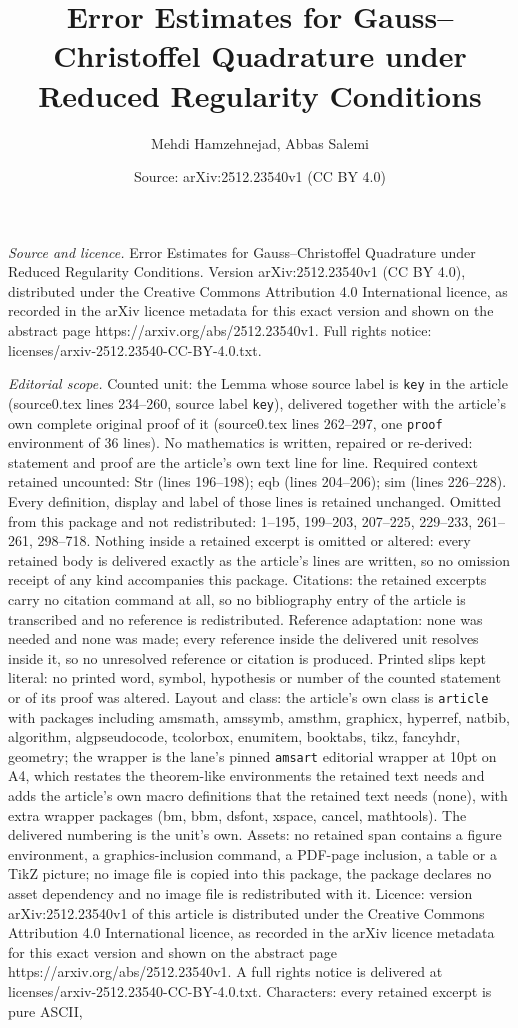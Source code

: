 \documentclass[10pt,a4paper]{amsart}
\title[Error Estimates for Gauss--Christoffel Quadrature under Redu]{Error Estimates for Gauss--Christoffel Quadrature under Reduced Regularity Conditions}
\author{Mehdi Hamzehnejad, Abbas Salemi}
\date{Source: arXiv:2512.23540v1 (CC BY 4.0)}
\begin{document}
\maketitle

\noindent\emph{Source and licence.} Error Estimates for Gauss--Christoffel Quadrature under Reduced Regularity Conditions. Version arXiv:2512.23540v1 (CC BY 4.0), distributed under the Creative Commons Attribution 4.0 International licence, as recorded in the arXiv licence metadata for this exact version and shown on the abstract page https://arxiv.org/abs/2512.23540v1. Full rights notice: licenses/arxiv-2512.23540-CC-BY-4.0.txt.\par\smallskip

\noindent\textit{Editorial scope.} Counted unit: the Lemma whose source label is \texttt{key} in the article (source0.tex lines 234--260, source label \texttt{key}), delivered together with the article's own complete original proof of it (source0.tex lines 262--297, one \texttt{proof} environment of 36 lines). No mathematics is written, repaired or re-derived: statement and proof are the article's own text line for line. Required context retained uncounted: Str (lines 196--198); eqb (lines 204--206); sim (lines 226--228). Every definition, display and label of those lines is retained unchanged. Omitted from this package and not redistributed: 1--195, 199--203, 207--225, 229--233, 261--261, 298--718. Nothing inside a retained excerpt is omitted or altered: every retained body is delivered exactly as the article's lines are written, so no omission receipt of any kind accompanies this package. Citations: the retained excerpts carry no citation command at all, so no bibliography entry of the article is transcribed and no reference is redistributed. Reference adaptation: none was needed and none was made; every reference inside the delivered unit resolves inside it, so no unresolved reference or citation is produced. Printed slips kept literal: no printed word, symbol, hypothesis or number of the counted statement or of its proof was altered. Layout and class: the article's own class is \texttt{article} with packages including amsmath, amssymb, amsthm, graphicx, hyperref, natbib, algorithm, algpseudocode, tcolorbox, enumitem, booktabs, tikz, fancyhdr, geometry; the wrapper is the lane's pinned \texttt{amsart} editorial wrapper at 10pt on A4, which restates the theorem-like environments the retained text needs and adds the article's own macro definitions that the retained text needs (none), with extra wrapper packages (bm, bbm, dsfont, xspace, cancel, mathtools). The delivered numbering is the unit's own. Assets: no retained span contains a figure environment, a graphics-inclusion command, a PDF-page inclusion, a table or a TikZ picture; no image file is copied into this package, the package declares no asset dependency and no image file is redistributed with it. Licence: version arXiv:2512.23540v1 of this article is distributed under the Creative Commons Attribution 4.0 International licence, as recorded in the arXiv licence metadata for this exact version and shown on the abstract page https://arxiv.org/abs/2512.23540v1. A full rights notice is delivered at licenses/arxiv-2512.23540-CC-BY-4.0.txt. Characters: every retained excerpt is pure ASCII, 
\end{document}
